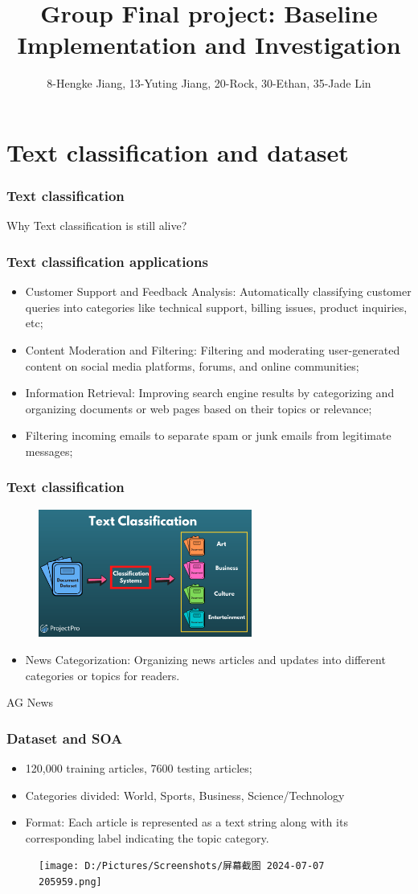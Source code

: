 \documentclass{beamer}
\title[Final project] 
{Group Final project: Baseline Implementation and Investigation}
\author{8-Hengke Jiang, 13-Yuting Jiang, 20-Rock, 30-Ethan, 35-Jade Lin}
\date[7.7.2024] %
\begin{document}
\frame{\titlepage}
\section{Text classification and dataset}
\begin{frame}
  \frametitle{Text classification}
  Why Text classification is still alive?
\end{frame}
\begin{frame}
  \frametitle{Text classification applications}
  \begin{itemize}
    \item Customer Support and Feedback Analysis: Automatically classifying customer queries into categories like technical support, billing issues, product inquiries, etc;
    \item Content Moderation and Filtering: Filtering and moderating user-generated content on social media platforms, forums, and online communities;
    \item Information Retrieval: Improving search engine results by categorizing and organizing documents or web pages based on their topics or relevance;
    \item Filtering incoming emails to separate spam or junk emails from legitimate messages;
  \end{itemize}
\end{frame}
\begin{frame}
  \frametitle{Text classification}
  \begin{figure}[H]
    \centering
    \includegraphics[width=7cm]{pictures/Text_Classification_Machine_Learning_NLP.png}
  \end{figure}
  \begin{itemize}
    \item News Categorization: Organizing news articles and updates into different categories or topics for readers.
  \end{itemize}
\end{frame}
\begin{frame}{AG News}
  \frametitle{Dataset and SOA}
  \begin{itemize}
    \item 120,000 training articles, 7600 testing articles;
    \item Categories divided: World, Sports, Business, Science/Technology
    \item Format: Each article is represented as a text string along with its corresponding label indicating the topic category.
  \end{itemize}
  \begin{figure}[H]
    \centering
    \texttt{[image: D:/Pictures/Screenshots/屏幕截图 2024-07-07 205959.png]}
  \end{figure}
\end{frame}
\end{document}
